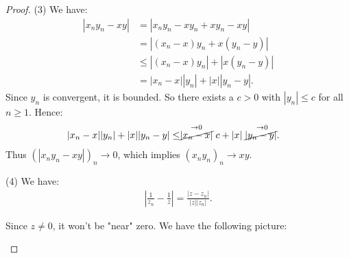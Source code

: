         \begin{proof}
            (3) We have:
                \begin{equation*}
                \begin{split}
                    |x_n y_n - xy|
                    & = |x_n y_n - xy_n + x y_n - xy| \\
                    & = \left|(x_n - x)y_n + x(y_n - y)\right|\\
                    & \leq |(x_n - x)y_n |+| x(y_n - y)| \\
                    & = |x_n - x||y_n| + |x||y_n - y|.
                \end{split}
                \end{equation*}
            Since $y_n$ is convergent, it is bounded. So there exists a $c > 0$ with $|y_n| \leq c$ for all $n \geq 1$. Hence:
                \begin{equation*}
                \begin{split}
                    |x_n - x||y_n| + |x||y_n - y|
                    & \leq \stackrel{\rightarrow 0}{\cancel{|x_n -x|}}c + |x|\stackrel{\rightarrow 0}{\cancel{|y_n - y|}.}
                \end{split}
                \end{equation*}
            Thus $(|x_n y_n - xy|)_n \rightarrow 0$, which implies $(x_n y_n)_n \rightarrow xy$.

            (4) We have:
                \begin{equation*}
                \begin{split}
                    \left|\frac{1}{z_n} - \frac{1}{z}\right| = \frac{|z- z_n|}{|z||z_n|}.
                \end{split}
                \end{equation*}

            Since $z \neq 0$, it won't be "near" zero. We have the following picture:
                \begin{center}
\end{center}
\end{proof}
